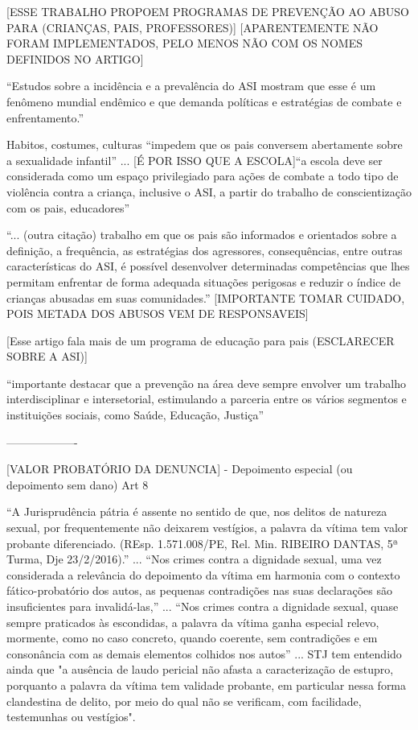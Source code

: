 [ESSE TRABALHO PROPOEM PROGRAMAS DE PREVENÇÃO AO ABUSO PARA (CRIANÇAS, PAIS, PROFESSORES)] \cite{mariscal2003programa} [APARENTEMENTE NÃO FORAM IMPLEMENTADOS, PELO MENOS NÃO COM OS NOMES DEFINIDOS NO ARTIGO]


``Estudos  sobre  a  incidência  e  a  prevalência  do  ASI  mostram  que  esse  é  um fenômeno  mundial  endêmico  e  que  demanda  políticas  e  estratégias  de  combate  e enfrentamento.'' \cite{pinto2017avaliaccao}

Habitos, costumes, culturas ``impedem que os pais conversem abertamente sobre a sexualidade infantil'' ...  [É POR ISSO QUE A ESCOLA]``a  escola  deve  ser  considerada  como  um  espaço  privilegiado  para ações  de  combate  a  todo  tipo  de  violência  contra  a  criança,  inclusive  o  ASI,  a  partir  do trabalho  de  conscientização  com  os  pais,  educadores'' \cite{pinto2017avaliaccao}

``... (outra citação) trabalho  em  que  os  pais  são informados  e  orientados  sobre  a  definição,  a  frequência,  as  estratégias  dos  agressores, consequências, entre outras características do ASI, é possível desenvolver determinadas competências  que  lhes  permitam  enfrentar  de  forma  adequada  situações  perigosas  e reduzir  o  índice  de  crianças  abusadas  em  suas  comunidades.'' [IMPORTANTE TOMAR CUIDADO, POIS METADA DOS ABUSOS VEM DE RESPONSAVEIS] \cite{pinto2017avaliaccao}

[Esse artigo fala mais de um programa de educação para pais (ESCLARECER SOBRE A ASI)]

``importante  destacar  que  a  prevenção  na  área  deve  sempre  envolver  um trabalho interdisciplinar e intersetorial, estimulando a parceria entre os vários segmentos e instituições   sociais,   como   Saúde,   Educação,   Justiça'' \cite{pinto2017avaliaccao}


------------------- 
\cite{planalto13431}


[VALOR PROBATÓRIO DA DENUNCIA] - Depoimento especial (ou depoimento sem dano) Art 8


``A Jurisprudência pátria é assente no sentido de que, nos delitos de natureza sexual, por frequentemente não deixarem vestígios, a palavra da vítima tem valor probante diferenciado. (REsp. 1.571.008/PE, Rel. Min. RIBEIRO DANTAS, 5ª Turma, Dje 23/2/2016).'' 
...
``Nos crimes contra a dignidade sexual, uma vez considerada a relevância do depoimento da vítima em harmonia com o contexto fático-probatório dos autos, as pequenas contradições nas suas declarações são insuficientes para invalidá-las,''
...
``Nos crimes contra a dignidade sexual, quase sempre praticados às escondidas, a palavra da vítima ganha especial relevo, mormente, como no caso concreto, quando coerente, sem contradições e em consonância com as demais elementos colhidos nos autos''
...
STJ tem entendido ainda que "a ausência de laudo pericial não afasta a caracterização de estupro, porquanto a palavra da vítima tem validade probante, em particular nessa forma clandestina de delito, por meio do qual não se verificam, com facilidade, testemunhas ou vestígios".

